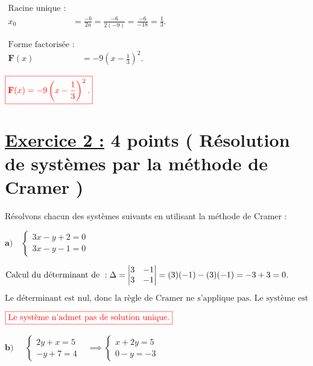 \documentclass[12pt,a4paper]{article}
\begin{document}
\begin{enumerate}
\(
\begin{aligned}
\text{Racine unique :} \\
x_0 &= \frac{-b}{2a} = \frac{-6}{2(-9)} = \frac{-6}{-18} = \frac{1}{3}.
\end{aligned}
\)

\(
\begin{aligned}
\text{Forme factorisée :} \\
\textbf{F}(x) &= -9(x - \frac{1}{3})^2.
\end{aligned}
\)

\(
\textcolor{red}{\boxed{\textbf{F}(x) = -9\left(x - \frac{1}{3}\right)^2.}}
\)

\end{enumerate}


\section*{\underline{Exercice 2 :} 4 points ( Résolution de systèmes par la méthode de Cramer )}
Résolvons chacun des systèmes suivants en utilisant la méthode de Cramer :

\(\textbf{a)}\quad
\begin{cases}
3x - y + 2 = 0 \\
3x - y - 1 = 0
\end{cases}
\)


\(
\text{Calcul du déterminant de } : \\
\Delta = \left| \begin{matrix} 3 & -1 \\ 3 & -1 \end{matrix} \right| = (3)(-1) - (3)(-1) = -3 + 3 = 0.
\)

\(
\text{Le déterminant est nul, donc la règle de Cramer ne s'applique pas. Le système est soit impossible, soit indéterminé.}
\)

\(
\textcolor{red}{\boxed{\text{Le système n'admet pas de solution unique.}}}\\
\)

\(\textbf{b)} \quad
\begin{aligned}
\begin{cases}
2y + x = 5 \\
-y + 7 = 4
\end{cases}&\implies
\begin{cases}
x+2y = 5 \\
0-y  = -3
\end{cases}
\end{aligned}
\)
\end{document}
